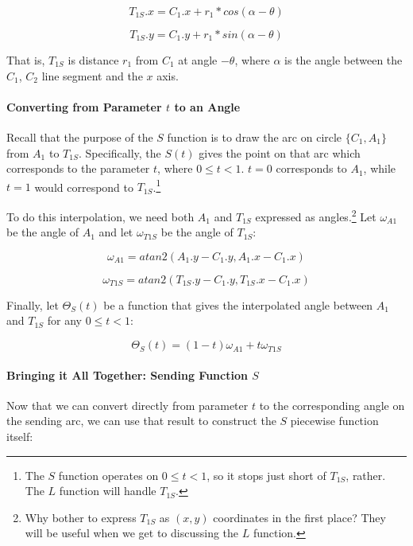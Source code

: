 \documentclass{article}
\begin{document}
\begin{equation}
    \label{eq:T_1S.x}
    T_{1S}.x = C_1.x + r_1 * cos(\alpha - \theta)
\end{equation}

\begin{equation}
    \label{eq:T_1S.y}
    T_{1S}.y = C_1.y + r_1 * sin(\alpha - \theta)
\end{equation}

That is, $T_{1S}$ is distance $r_1$ from $C_1$ at angle $-\theta$, where $\alpha$ is the angle between the $C_1$, $C_2$ line segment and the $x$ axis. 

\paragraph{Converting from Parameter $t$ to an Angle}
Recall that the purpose of the $S$ function is to draw the arc on  circle $\{C_1, A_1\}$ from $A_1$ to $T_{1S}$. Specifically, the $S(t)$ gives the point on that arc which corresponds to the parameter $t$, where $0 \leq t < 1$. $t = 0$ corresponds to $A_1$, while $t = 1$ would correspond to $T_{1S}$.\footnote{The $S$ function operates on $0 \leq t < 1$, so it stops just short of $T_{1S}$, rather. The $L$ function will handle $T_{1S}$.}

To do this interpolation, we need both $A_1$ and $T_{1S}$ expressed as angles.\footnote{Why bother to express $T_{1S}$ as $(x,y)$ coordinates in the first place? They will be useful when we get to discussing the $L$ function.} Let $\omega_{A1}$ be the angle of $A_1$ and let $\omega_{T1S}$ be the angle of $T_{1S}$:

\begin{equation}
    \label{eq:omega_A1}
    \omega_{A1} = atan2(A_1.y - C_1.y, A_1.x - C_1.x)
\end{equation}

\begin{equation}
    \label{eq:omega_T1S}
    \omega_{T1S} = atan2(T_{1S}.y - C_1.y, T_{1S}.x - C_1.x)
\end{equation} 

Finally, let $\Theta_S(t)$ be a function that gives the interpolated angle between $A_1$ and $T_{1S}$ for any $0 \leq t < 1$:

\begin{equation}
    \label{eq:Theta_S(t)}
    \Theta_S(t) = (1-t) \omega_{A1} + t \omega_{T1S}
\end{equation} 

\paragraph{Bringing it All Together: Sending Function $S$}
Now that we can convert directly from parameter $t$ to the corresponding angle on the sending arc, we can use that result to construct the $S$ piecewise function itself:
\end{document}
